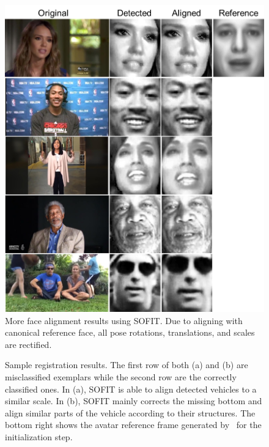 \documentclass[10pt,journal]{IEEEtran}
\begin{document}
\begin{figure}[htbp]
	\centering
		\includegraphics[width=.8\columnwidth]{fig/suppliment.png}
	\caption{More face alignment results using SOFIT. Due to aligning with canonical reference face, all pose rotations, translations, and scales are rectified. }
	\label{fig:suppliment}
\end{figure}


\begin{figure}[htbp]
	\centering


	\caption{Sample registration results. The first row of both (a) and (b) are misclassified exemplars while the second row are the correctly classified ones. In (a), SOFIT is able to align detected vehicles to a similar scale. In (b), SOFIT mainly corrects the missing bottom and align similar parts of the vehicle according to their structures. The bottom right shows the avatar reference frame generated by~\cite{Yang_SMCB12} for the initialization step.}
	\label{fig:vehicle_reg_sample}
\end{figure}
\end{document}

